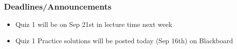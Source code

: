 
\begin{frame}
    \frametitle{Deadlines/Announcements}
    \begin{itemize}
            \item Quiz 1 will be on Sep 21st in lecture time next week
            \item Quiz 1 Practice solutions will be posted today (Sep 16th) on Blackboard
    \end{itemize}
\end{frame}
